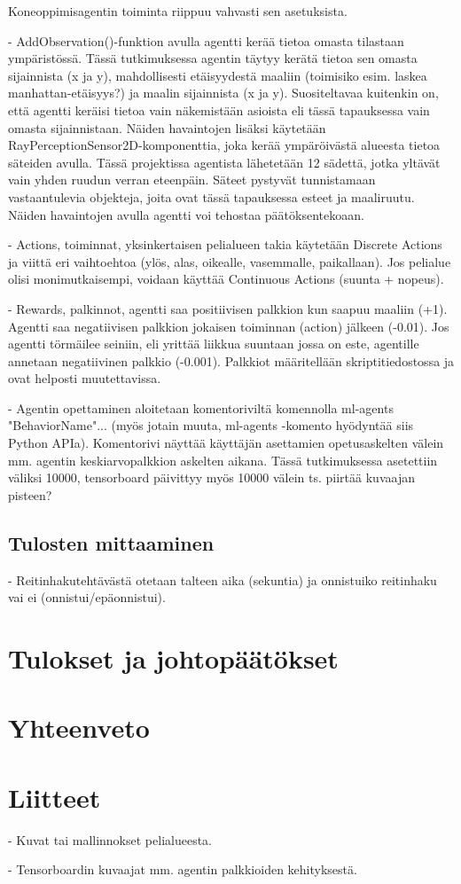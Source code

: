 \documentclass[utf8]{gradu3}
\begin{document}
Koneoppimisagentin toiminta riippuu vahvasti sen asetuksista.

- AddObservation()-funktion avulla agentti kerää tietoa omasta tilastaan ympäristössä. Tässä tutkimuksessa agentin täytyy kerätä tietoa sen omasta sijainnista (x ja y), mahdollisesti etäisyydestä maaliin (toimisiko esim. laskea manhattan-etäisyys?) ja maalin sijainnista (x ja y). Suositeltavaa kuitenkin on, että agentti keräisi tietoa vain näkemistään asioista eli tässä tapauksessa vain omasta sijainnistaan. Näiden havaintojen lisäksi käytetään RayPerceptionSensor2D-komponenttia, joka kerää ympäröivästä alueesta tietoa säteiden avulla. Tässä projektissa agentista lähetetään 12 sädettä, jotka yltävät vain yhden ruudun verran eteenpäin. Säteet pystyvät tunnistamaan vastaantulevia objekteja, joita ovat tässä tapauksessa esteet ja maaliruutu. Näiden havaintojen avulla agentti voi tehostaa päätöksentekoaan.

- Actions, toiminnat, yksinkertaisen pelialueen takia käytetään Discrete Actions ja viittä eri vaihtoehtoa (ylös, alas, oikealle, vasemmalle, paikallaan). Jos pelialue olisi monimutkaisempi, voidaan käyttää Continuous Actions (suunta + nopeus).

- Rewards, palkinnot, agentti saa positiivisen palkkion kun saapuu maaliin (+1). Agentti saa negatiivisen palkkion jokaisen toiminnan (action) jälkeen (-0.01). Jos agentti törmäilee seiniin, eli yrittää liikkua suuntaan jossa on este, agentille annetaan negatiivinen palkkio (-0.001). Palkkiot määritellään skriptitiedostossa ja ovat helposti muutettavissa.

- Agentin opettaminen aloitetaan komentoriviltä komennolla ml-agents "BehaviorName"... (myös jotain muuta, ml-agents -komento hyödyntää siis Python APIa). Komentorivi näyttää käyttäjän asettamien opetusaskelten välein mm. agentin keskiarvopalkkion askelten aikana. Tässä tutkimuksessa asetettiin väliksi 10000, tensorboard päivittyy myös 10000 välein ts. piirtää kuvaajan pisteen?

\section{Tulosten mittaaminen}
\label{sec:mittaaminen}

- Reitinhakutehtävästä otetaan talteen aika (sekuntia) ja onnistuiko reitinhaku vai ei (onnistui/epäonnistui).

\chapter{Tulokset ja johtopäätökset}

\chapter{Yhteenveto}

\printbibliography

\chapter{Liitteet}

- Kuvat tai mallinnokset pelialueesta.

- Tensorboardin kuvaajat mm. agentin palkkioiden kehityksestä.
\end{document}
